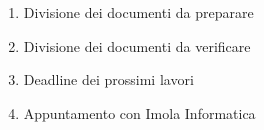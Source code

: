 \begin{enumerate}
    \item Divisione dei documenti da preparare
    \item Divisione dei documenti da verificare
    \item Deadline dei prossimi lavori
    \item Appuntamento con Imola Informatica
\end{enumerate}